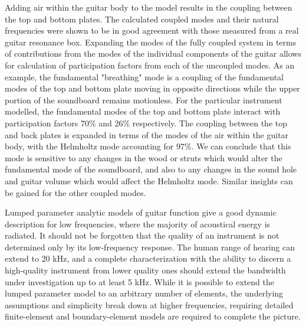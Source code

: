 \documentclass[
reprint,amsmath,amssymb,showpacs,citeautoscript,prb,twocolumn,notitlepage,floatfix
]{revtex4-1}
\begin{document}
Adding air within the guitar body to the model results in the coupling between the top and bottom plates. The calculated coupled modes and their natural frequencies were shown to be in good agreement with those measured from a real guitar resonance box. Expanding the modes of the fully coupled system in terms of contributions from the modes of the individual components of the guitar allows for calculation of participation factors from each of the uncoupled modes. As an example, the fundamental "breathing" mode is a coupling of the fundamental modes of the top and bottom plate moving in opposite directions while the upper portion of the soundboard remains motionless. For the particular instrument modelled, the fundamental modes of the top and bottom plate  interact with participation factors 70\% and 26\% respectively. The coupling between the top and back plates is expanded in terms of the modes of the air within the guitar body, with the Helmholtz mode accounting for 97\%.  We can conclude that this mode is sensitive to any changes in the wood or struts which would alter the fundamental mode of the soundboard, and also to any changes in the sound hole and guitar volume which would affect the Helmholtz mode. Similar insights can be gained for the other coupled modes.

Lumped parameter analytic models of guitar function give a good dynamic description for low frequencies, where the majority of acoustical energy is radiated. It should not be forgotten that the quality of an instrument is not determined only by its low-frequency response. The human range of hearing can extend to 20 kHz, and a complete characterization with the ability to discern a high-quality instrument from lower quality ones should extend the bandwidth under investigation up to at least 5 kHz\cite{CzajkowskaMarzena2012Aocg}. While it is possible to extend the lumped parameter model to an arbitrary number of elements, the underlying assumptions and simplicity break down at higher frequencies, requiring detailed finite-element and boundary-element models are required to complete the picture.


\nocite{*}

\end{document}
